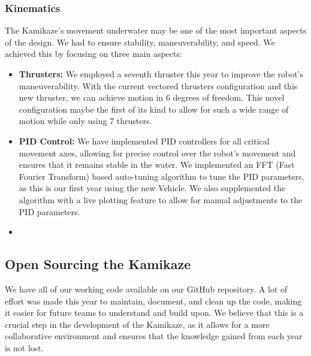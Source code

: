 \subsubsection{Kinematics}
The Kamikaze's movement underwater may be one of the most important aspects of
the design. We had to ensure stability, maneuverability, and speed. We achieved
this by focusing on three main aspects:
\begin{itemize}
        
    \item \textbf{Thrusters:} We employed a seventh thruster this year to
        improve the robot's maneuverability. With the current vectored thrusters
        configuration and this new thruster, we can achieve motion in 6 degrees of freedom.
        This novel configuration maybe the first of its kind to allow for such a wide range of motion while only using 7 thrusters.

        \item \textbf{PID Control:} We have implemented PID controllers for all critical movement axes, allowing for
        precise control over the robot's movement and ensures that it remains stable in the water. We implemented an FFT (Fast Fourier Transform)
        based auto-tuning algorithm to tune the PID parameters, as this is our first year using the new Vehicle. We also supplemented the algorithm with a live
        plotting feature to allow for manual adjustments to the PID parameters.

        \item \textbf{}        

\end{itemize}

\subsection{Open Sourcing the Kamikaze}
We have all of our working code available on our GitHub repository. A lot of effort
was made this year to maintain, document, and clean up the code, making it easier
for future teams to understand and build upon. We believe that this is a crucial
step in the development of the Kamikaze, as it allows for a more collaborative
environment and ensures that the knowledge gained from each year is not lost. 

